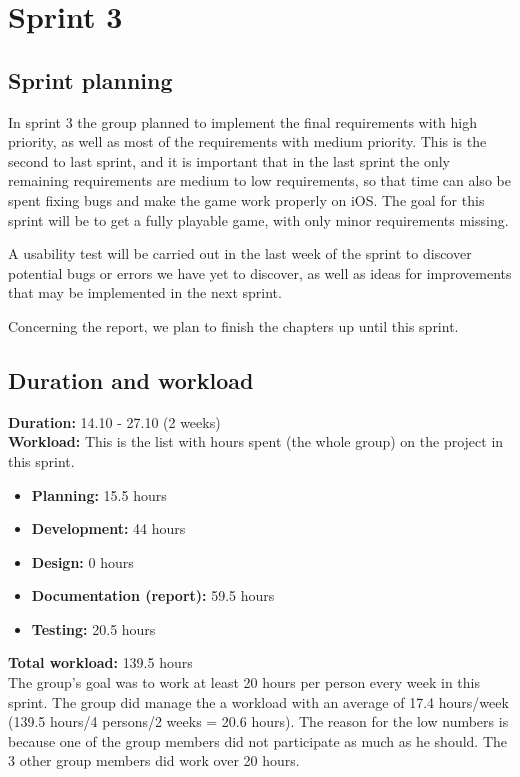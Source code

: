 \section{Sprint 3}

\subsection{Sprint planning}
	In sprint 3 the group planned to implement the final requirements with high priority, as well as most of the requirements with medium priority. This is the second to last sprint, and it is important that in the last sprint the  only remaining requirements are medium to low requirements, so that time can also be spent fixing bugs and make the game work properly on iOS. The goal for this sprint will be to get a fully playable game, with only minor requirements missing.

	A usability test will be carried out in the last week of the sprint to discover potential bugs or errors we have yet to discover, as well as ideas for improvements that may be implemented in the next sprint.

	Concerning the report, we plan to finish the chapters up until this sprint.

\subsection{Duration and workload}
	
	{\bf Duration:} 14.10 - 27.10 (2 weeks)\\
	{\bf Workload:} This is the list with hours spent (the whole group) on the project in this sprint.
	\begin{itemize}
		\item {\bf Planning:} 15.5 hours
		\item {\bf Development:} 44 hours
		\item {\bf Design:} 0 hours
		\item {\bf Documentation (report):} 59.5 hours
		\item {\bf Testing:} 20.5 hours 
	\end{itemize}
	{\bf Total workload: } 139.5 hours \\
	
	The group's goal was to work at least 20 hours per person every week in this sprint. 
	The group did manage the a workload with an average of 17.4 hours/week (139.5 hours/4 persons/2 weeks = 20.6 hours). The reason for the low numbers is because one of the group members did not
	participate as much as he should. The 3 other group members did work over 20 hours. 


